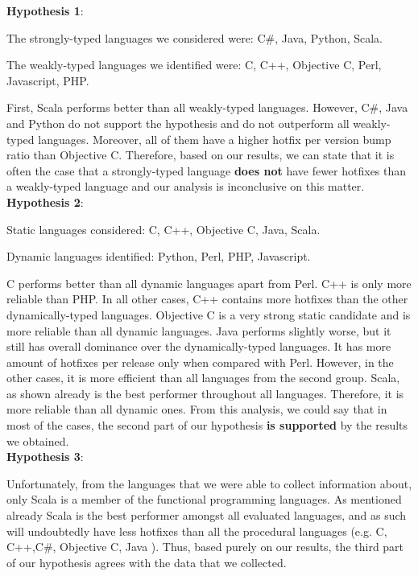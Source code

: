 \textbf{Hypothesis 1}:\par
The strongly-typed languages we considered were: C\#, Java, Python, Scala.\par
The weakly-typed languages we identified were: C, C++, Objective C, Perl, Javascript, PHP.\par

First, Scala performs better than all weakly-typed languages. However, C\#, Java and Python do not support the hypothesis and do not outperform all weakly-typed languages. Moreover, all of them have a higher hotfix per version bump ratio than Objective C. Therefore, based on our results, we can state that it is often the case that a strongly-typed language \textbf{does not} have fewer hotfixes than a weakly-typed language and our analysis is inconclusive on this matter.\\

\textbf{Hypothesis 2}:\par
Static languages considered: C, C++, Objective C, Java, Scala.\par
Dynamic languages identified: Python, Perl, PHP, Javascript.\par

C performs better than all dynamic languages apart from Perl. 
C++ is only more reliable than PHP. In all other cases, C++ contains more hotfixes than the other dynamically-typed languages. 
Objective C is a very strong static candidate and is more reliable than all dynamic languages. Java performs slightly worse, but it still has overall dominance over the dynamically-typed languages. It has more amount of hotfixes per release only when compared with Perl. However, in the other cases, it is more efficient than all languages from the second group. Scala, as shown already is the best performer throughout all languages. Therefore, it is more reliable than all dynamic ones. From this analysis, we could say that in most of the cases, the second part of our hypothesis \textbf{is supported} by the results we obtained.\\

\textbf{Hypothesis 3}:\par
Unfortunately, from the languages that we were able to collect information about, only Scala is a member of the functional programming languages. As mentioned already Scala is the best performer amongst all evaluated languages, and as such will undoubtedly have less hotfixes than all the procedural languages (e.g. C, C++,C\#, Objective C, Java ). Thus, based purely on our results, the third part of our hypothesis agrees with the data that we collected.\par

